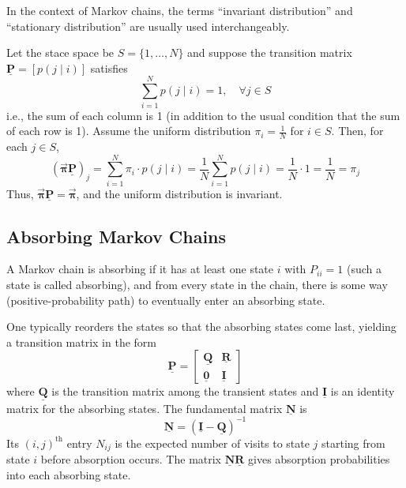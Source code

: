 \documentclass[10pt, headings=standardclasses, parskip=half, twoside]{scrartcl}
\renewcommand{\emph}[1]{\textcolor{mypurple}{#1}}
\newcommand{\matr}[1]{\underline{\boldsymbol{#1}}}
\newcommand{\vect}[1]{\vec{\boldsymbol{#1}}}
\begin{document}
In the context of Markov chains, the terms “invariant distribution” and “stationary distribution” are usually used interchangeably. 

\begin{example}\label{ex:doubly_stochastic_chain}
  Let the stace space be \(S=\{1,\ldots,N\}\) and suppose the transition matrix \(\matr{P} = [p(j \mid i)]\) satisfies
  \[
  \sum_{i=1}^N p(j \mid i) = 1,\quad \forall j\in S
  \]
  i.e., the sum of each column is 1 (in addition to the usual condition that the sum of each row is 1). 
  Assume the uniform distribution \(\pi_i = \frac{1}{N}\) for \(i\in S\).
  Then, for each \(j\in S\),
  \[
  (\vect{\pi} \matr{P})_j = \sum_{i=1}^N \pi_i \cdot p(j \mid i) = \frac{1}{N} \sum_{i=1}^N p(j \mid i) = \frac{1}{N} \cdot 1 = \frac{1}{N} = \pi_j
  \]
  Thus, \(\vect{\pi} \matr{P} = \vect{\pi}\), and the uniform distribution is invariant.
\end{example}


\subsection{Absorbing Markov Chains}\label{subsec:absorbing}
A Markov chain is \emph{absorbing} if it has at least one state \(i\) with \(P_{ii}=1\) (such a state is called \emph{absorbing}), and from every state in the chain, there is some way (positive-probability path) to eventually enter an absorbing state.

One typically reorders the states so that the absorbing states come last, yielding a transition matrix in the form
\[
\matr{P}=
\begin{bmatrix}
\matr{Q} & \matr{R} \\
\matr{0} & \matr{I}
\end{bmatrix}
\]
where \(\matr{Q}\) is the transition matrix among the transient states and \(\matr{I}\) is an identity matrix for the absorbing states.
The \emph{fundamental matrix} \(\matr{N}\) is
\[
\matr{N}=(\matr{I}-\matr{Q})^{-1}
\]
Its \((i,j)^\text{th}\) entry \(N_{ij}\) is the expected number of visits to state \(j\) starting from state \(i\) before absorption occurs.
The matrix \(\matr{N} \matr{R}\) gives absorption probabilities into each absorbing state.
\end{document}
